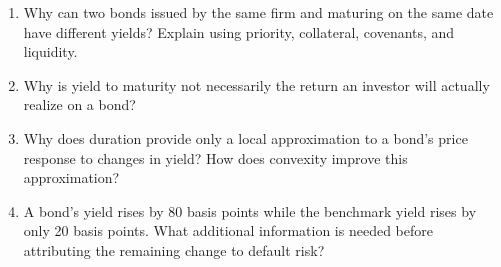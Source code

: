 

\begin{enumerate}

\item Why can two bonds issued by the same firm and maturing on the same date have different yields? Explain using priority, collateral, covenants, and liquidity.

\item Why is yield to maturity not necessarily the return an investor will actually realize on a bond?

\item Why does duration provide only a local approximation to a bond's price response to changes in yield? How does convexity improve this approximation?

\item A bond's yield rises by 80 basis points while the benchmark yield rises by only 20 basis points. What additional information is needed before attributing the remaining change to default risk?

\end{enumerate}



